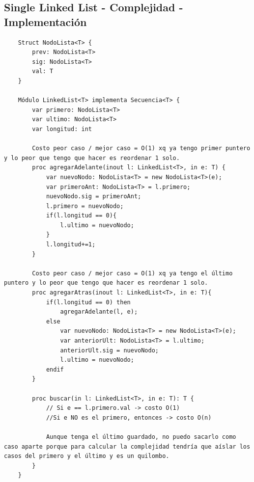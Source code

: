 \documentclass[10pt,a4paper]{article}
\begin{document}
\subsection*{Single Linked List - Complejidad - Implementación}
\label{subsec:complejidad_modulo_sll}
\begin{lstlisting}
    Struct NodoLista<T> {
        prev: NodoLista<T>
        sig: NodoLista<T>
        val: T
    }

    Módulo LinkedList<T> implementa Secuencia<T> {
        var primero: NodoLista<T>
        var ultimo: NodoLista<T>
        var longitud: int

        Costo peor caso / mejor caso = O(1) xq ya tengo primer puntero y lo peor que tengo que hacer es reordenar 1 solo. 
        proc agregarAdelante(inout l: LinkedList<T>, in e: T) {
            var nuevoNodo: NodoLista<T> = new NodoLista<T>(e);
            var primeroAnt: NodoLista<T> = l.primero;
            nuevoNodo.sig = primeroAnt;
            l.primero = nuevoNodo;
            if(l.longitud == 0){
                l.ultimo = nuevoNodo; 
            }
            l.longitud+=1;
        }

        Costo peor caso / mejor caso = O(1) xq ya tengo el último puntero y lo peor que tengo que hacer es reordenar 1 solo.
        proc agregarAtras(inout l: LinkedList<T>, in e: T){
            if(l.longitud == 0) then
                agregarAdelante(l, e);
            else
                var nuevoNodo: NodoLista<T> = new NodoLista<T>(e);
                var anteriorUlt: NodoLista<T> = l.ultimo; 
                anteriorUlt.sig = nuevoNodo; 
                l.ultimo = nuevoNodo; 
            endif
        }
        
        proc buscar(in l: LinkedList<T>, in e: T): T {
            // Si e == l.primero.val -> costo O(1)
            //Si e NO es el primero, entonces -> costo O(n)

            Aunque tenga el último guardado, no puedo sacarlo como caso aparte porque para calcular la complejidad tendría que aíslar los casos del primero y el último y es un quilombo.
        }
    }
\end{lstlisting}
\end{document}

